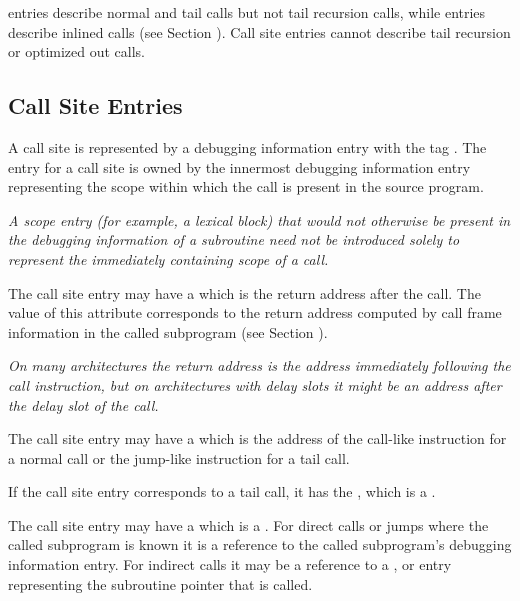 \DWTAGcallsite{} entries describe normal and tail calls but not tail recursion calls,
while \DWTAGinlinedsubroutine{} entries describe inlined calls 
(see Section ).
Call site entries cannot describe tail recursion or optimized out calls.

\subsection{Call Site Entries}
\label{chap:callsiteentries}
A call site is represented by a debugging information entry with the tag
\DWTAGcallsiteTARG{}. 
The entry for a call site is owned by the innermost
debugging information entry representing the scope within which the
call is present in the source program.

\textit{A scope entry (for example, a lexical block) that would not 
otherwise be present in the debugging information of a subroutine
need not be introduced solely to represent the immediately containing scope
of a call.}

The call site entry may have a
\DWATcallreturnpcDEFN{}
which is the return address after the call.  
The value of this attribute corresponds to the return address 
computed by call frame information in the called subprogram 
(see Section ).

\textit{On many architectures the return address is the 
address immediately following the call instruction, but 
on architectures with delay slots it might
be an address after the delay slot of the call.}

The call site entry may have a 
\DWATcallpcDEFN{}
which is the address of the 
call-like instruction for a normal call or the jump-like 
instruction for a tail call.

If the call site entry corresponds to a tail call, it has the 
\DWATcalltailcallDEFN{}
,
which is a \CLASSflag.

The call site entry may have a 
\DWATcalloriginDEFN{}
which is a \CLASSreference.  For direct calls or jumps where the called 
subprogram is known it is a reference to the called subprogram's debugging
information entry.  For indirect calls it may be a reference to a
\DWTAGvariable{}, \DWTAGformalparameter{} or \DWTAGmember{} entry representing
the subroutine pointer that is called.

